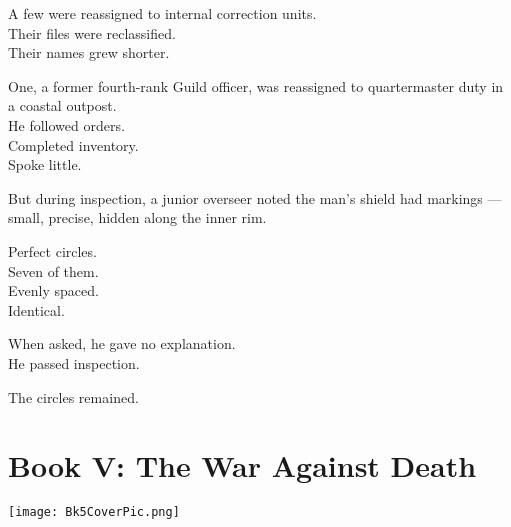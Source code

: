 \documentclass[9pt]{article}
\begin{document}
A few were reassigned to internal correction units.\\
Their files were reclassified.\\
Their names grew shorter.

\vspace{1em}

One, a former fourth-rank Guild officer, was reassigned to quartermaster duty in a coastal outpost.\\
He followed orders.\\
Completed inventory.\\
Spoke little.

But during inspection, a junior overseer noted the man’s shield had markings — small, precise, hidden along the inner rim.

Perfect circles.\\
Seven of them.\\
Evenly spaced.\\
Identical.

When asked, he gave no explanation.\\
He passed inspection.

The circles remained.

\newpage

\section*{Book V: The War Against Death}

\vspace{.65in}

\begin{center}
    \texttt{[image: Bk5CoverPic.png]}
\end{center}

\vspace{.65in}
\end{document}
